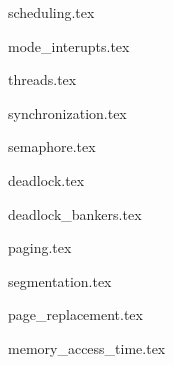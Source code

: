
{scheduling.tex}           \newpage

{mode_interupts.tex}       \newpage

{threads.tex}              \newpage

{synchronization.tex}      \newpage

{semaphore.tex}            \newpage

{deadlock.tex}            \newpage

{deadlock_bankers.tex}    \newpage

{paging.tex}              \newpage

{segmentation.tex}        \newpage

{page_replacement.tex}    \newpage

{memory_access_time.tex}    \newpage
